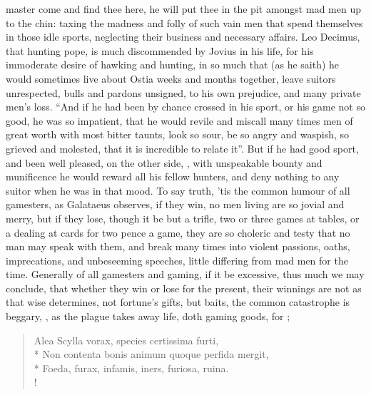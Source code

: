 master come and find thee here, he will put thee in the pit amongst mad men up
to the chin: taxing the madness and folly of such vain men that spend
themselves in those idle sports, neglecting their business and necessary
affairs. Leo Decimus, that hunting pope, is much discommended by
Jovius in his life, for his immoderate desire of hawking
and hunting, in so much that (as he saith) he would sometimes live about Ostia
weeks and months together, leave suitors unrespected,
bulls and pardons unsigned, to his own prejudice, and many private men's loss.
\enquote{And if he had been by chance crossed in his sport, or his
game not so good, he was so impatient, that he would revile and miscall many
times men of great worth with most bitter taunts, look so sour, be so angry and
waspish, so grieved and molested, that it is incredible to relate it}. But if
he had good sport, and been well pleased, on the other side, , with unspeakable bounty and munificence he would reward all his
fellow hunters, and deny nothing to any suitor when he was in that mood. To say
truth, 'tis the common humour of all gamesters, as Galataeus observes, if they
win, no men living are so jovial and merry, but if they
lose, though it be but a trifle, two or three games at tables, or a dealing at
cards for two pence a game, they are so choleric and testy that no man may
speak with them, and break many times into violent passions, oaths,
imprecations, and unbeseeming speeches, little differing from mad men for the
time. Generally of all gamesters and gaming, if it be excessive, thus much we
may conclude, that whether they win or lose for the present, their winnings are
not  as that wise \Seneca{} determines, not
fortune's gifts, but baits, the common catastrophe is
beggary, , as the plague takes away life, doth gaming goods, for
;

\begin{latin}
\begin{verse}%
Alea Scylla vorax, species certissima furti,\\*
Non contenta bonis animum quoque perfida mergit,\\*
Foeda, furax, infamis, iners, furiosa, ruina.\\!
\end{verse}%
\end{latin}

